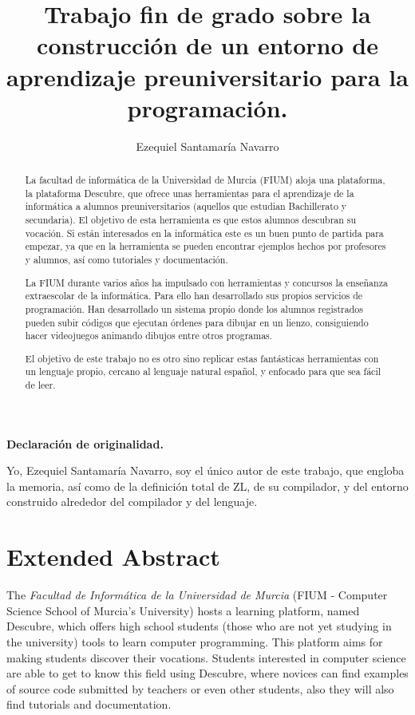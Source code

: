 \documentclass{report}
\author{Ezequiel Santamaría Navarro}
\title{Trabajo fin de grado sobre la construcción de un entorno de aprendizaje preuniversitario para la programación.}
\begin{document}
	
	\maketitle
	
	\centering
	\textbf{Declaración de originalidad.}
	
	\vspace{50px}
	
	Yo, Ezequiel Santamaría Navarro, soy el único autor de este trabajo, que engloba la memoria, así como de la definición total de ZL, de su compilador, y del entorno construido alrededor del compilador y del lenguaje. 
	
	\tableofcontents
	\listoffigures
		
		
	\begin{abstract}
		La facultad de informática de la Universidad de Murcia (FIUM) aloja una plataforma, la plataforma Descubre, que ofrece unas herramientas para el aprendizaje de la informática a alumnos preuniversitarios (aquellos que estudian Bachillerato y secundaria). El objetivo de esta herramienta es que estos alumnos descubran su vocación. Si están interesados en la informática este es un buen punto de partida para empezar, ya que en la herramienta se pueden encontrar ejemplos hechos por profesores y alumnos, así como tutoriales y documentación. 
		
		La FIUM durante varios años ha impulsado con herramientas y concursos la enseñanza extraescolar de la informática. Para ello han desarrollado sus propios servicios de programación. Han desarrollado un sistema propio donde los alumnos registrados pueden subir códigos que ejecutan órdenes para dibujar en un lienzo, consiguiendo hacer videojuegos animando dibujos entre otros programas.
		
		El objetivo de este trabajo no es otro sino replicar estas fantásticas herramientas con un lenguaje propio, cercano al lenguaje natural español, y enfocado para que sea fácil de leer. 
	\end{abstract}
	
	\chapter{Extended Abstract}
	
	The \textit{Facultad de Informática de la Universidad de Murcia} (FIUM - Computer Science School of Murcia's University) hosts a learning platform, named Descubre, which offers high school students (those who are not yet studying in the university) tools to learn computer programming. This platform aims for making students discover their vocations. Students interested in computer science are able to get to know this field using Descubre, where novices can find examples of source code submitted by teachers or even other students, also they will also find tutorials and documentation. 
	
\end{document}
